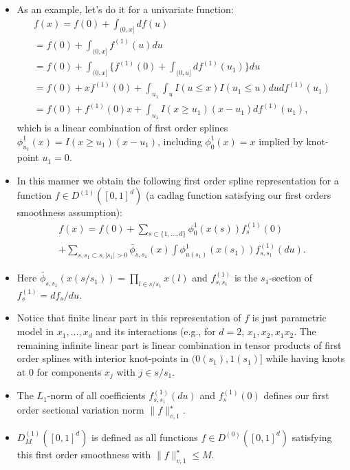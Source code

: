 \documentclass[t]{beamer}
\begin{document}
\begin{frame}
\begin{itemize}
\item As an example, let's do it for a univariate function:
\[
\begin{array}{l}
f(x)=f(0)+\int_{(0,x]} df(u)\\
= f(0)+\int_{(0,x]} f^{(1)}(u) du\\
=f(0)+\int_{(0,x]} \{f^{(1)}(0)+\int_{(0,u]} df^{(1)}(u_1)\} du\\
= f(0)+x f^{(1)}(0)+\int_{u_1}\int_u I(u\leq x) I(u_1\leq u) du df^{(1)}(u_1)\\
=f(0)+f^{(1)}(0) x+\int_{u_1} I(x\geq u_1)(x-u_1) df^{(1)}(u_1),
\end{array}
\]
which is a linear combination of first order splines $\phi^1_{u_1}(x)=I(x\geq u_1)(x-u_1)$, including $\phi^1_0(x)=x$ implied by knot-point $u_1=0$.
\end{itemize}
\end{frame}

\begin{frame}
\begin{itemize}
\item In this manner we obtain the following first order spline representation for a function
$f\in D^{(1)}([0,1]^d)$ (a cadlag function satisfying our first orders smoothness assumption):
\[
\begin{array}{l}
f(x)=f(0)+\sum_{s\subset \{1,\ldots,d\}} \phi^1_0(x(s))f^{(1)}_s(0)\\
+
\sum_{s,s_1\subset s, \mid s_1\mid>0}\bar{\phi}_{s,s_1}(x)\int \phi^1_{u(s_1)}(x(s_1)) f^{(1)}_{s,s_1}(du).\end{array}
\]
\item Here $\bar{\phi}_{s,s_1}(x(s/s_1))=\prod_{l\in s/s_1}x(l)$ and $f^{(1)}_{s,s_1}$ is the $s_1$-section of $f^{(1)}_s=df_s/du$.
\end{itemize}
\end{frame}

\begin{frame}
\begin{itemize}
\item Notice that finite linear part in this representation of $f$ is just parametric model in $x_1,\ldots,x_d$ and its interactions (e.g., for $d=2$, $x_1,x_2,x_1x_2$. The remaining infinite linear part is linear combination in tensor products of first order splines with interior knot-points in $(0(s_1),1(s_1)]$ while having knots at 0 for components $x_j$ with $j\in s/s_1$.
\item The $L_1$-norm  of all coefficients $f^{(1)}_{s,s_1}(du)$ and
$f^{(1)}_s(0)$ defines our first order sectional variation norm $\lVert f\rVert_{v,1}^{\star}$.
\item $D^{(1)}_M([0,1]^d)$ is defined as all functions $f\in D^{(0)}([0,1]^d)$
satisfying this first order smoothness with $\lVert f\rVert_{v,1}^{\star}\leq M$.
\end{itemize}
\end{frame}
\end{document}

